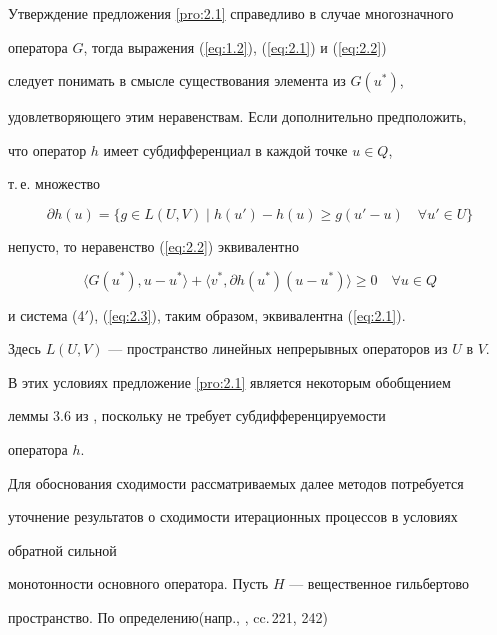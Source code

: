 \begin{note}


Утверждение предложения \ref{pro:2.1} справедливо в случае многозначного 


оператора $G$, тогда выражения (\ref{eq:1.2}), (\ref{eq:2.1}) и (\ref{eq:2.2})


следует понимать в смысле существования элемента из $G(u^*) $, 


удовлетворяющего этим неравенствам. Если дополнительно предположить,


что оператор $h$ имеет субдифференциал в каждой точке $u \in Q$, 


т.\,е. множество


$$


\partial h(u)=\{g\in L(U,V) \mid h(u')-h(u)\geq g(u'-u)


\quad \forall u' \in U \}


$$


непусто, то неравенство (\ref{eq:2.2}) эквивалентно


\begin{equation}


\langle G(u^*), u-u^* \rangle+\langle v^*,\partial h(u^*)(u-u^*)\rangle\geq0


\quad \forall u \in Q \tag{4$'$}


\end{equation}


и система (4${}'$), (\ref{eq:2.3}), таким образом, эквивалентна (\ref{eq:2.1}).


Здесь $L(U,V)$ --- пространство линейных непрерывных операторов из $U$ в $V$.


В этих условиях предложение \ref{pro:2.1} является некоторым обобщением 


леммы 3.6 из \cite{BG89}, поскольку не требует субдифференцируемости


оператора $h$.


\end{note}





Для обоснования сходимости рассматриваемых далее методов потребуется 


уточнение результатов о сходимости итерационных процессов в условиях


обратной сильной 


монотонности основного оператора. Пусть $H$ --- вещественное гильбертово 


пространство. По определению\linebreak (напр., \cite{GT89}, cc.\,221, 242)



